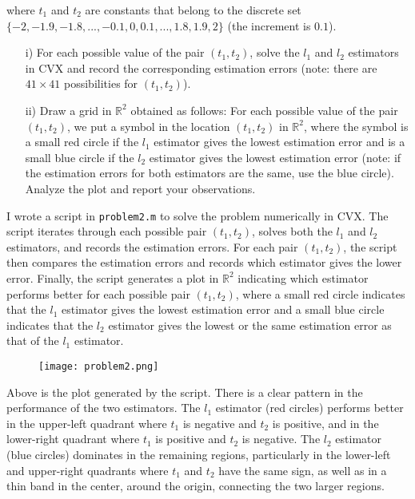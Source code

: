 \begin{homeworkProblem}
    where $t_1$ and $t_2$ are constants that belong to the discrete set 
    $\{-2, -1.9, -1.8, ..., -0.1, 0, 0.1, ..., 1.8, 1.9, 2\}$ (the increment 
    is $0.1$).
    
    \begin{itemize}
        \item [i)] For each possible value of the pair $(t_1, t_2)$, solve the 
            $l_1$ and $l_2$ estimators in CVX and record the corresponding 
            estimation errors (note: there are $41 \times 41$ possibilities 
            for $(t_1, t_2)$). 
        \item [ii)] Draw a grid in $\mathbb R^2$ obtained as follows: For each 
            possible value of the pair $(t_1, t_2)$, we put a symbol in the 
            location $(t_1, t_2)$ in $\mathbb R^2$, where the symbol is a small 
            red circle if the $l_1$ estimator gives the lowest estimation error 
            and is a small blue circle if the $l_2$ estimator gives the lowest 
            estimation error (note: if the estimation errors for both 
            estimators are the same, use the blue circle). Analyze the plot 
            and report your observations. 
    \end{itemize}

    \begin{solution}
        
        I wrote a script in \texttt{problem2.m} to solve the problem
        numerically in CVX. The script iterates through each possible pair
        $(t_1, t_2)$, solves both the $l_1$ and $l_2$ estimators, and
        records the estimation errors. For each pair $(t_1, t_2)$, the 
        script then compares the estimation errors and records which estimator 
        gives the lower error. Finally, the script generates a plot in 
        $\mathbb{R}^2$ indicating which estimator performs better for each 
        possible pair $(t_1, t_2)$, where a small red circle indicates that 
        the $l_1$ estimator gives the lowest estimation error and a small blue 
        circle indicates that the $l_2$ estimator gives the lowest or the same 
        estimation error as that of the $l_1$ estimator.

        \begin{figure}[h!]
            \centering
            \texttt{[image: problem2.png]}
        \end{figure}

        \pagebreak

        Above is the plot generated by the script. There is a clear pattern 
        in the performance of the two estimators. The $l_1$ estimator (red 
        circles) performs better in the upper-left quadrant where $t_1$ is
        negative and $t_2$ is positive, and in the lower-right quadrant where 
        $t_1$ is positive and $t_2$ is negative. The $l_2$ estimator 
        (blue circles) dominates in the remaining regions, particularly in 
        the lower-left and upper-right quadrants where $t_1$ and $t_2$ have 
        the same sign, as well as in a thin band in the center, around the
        origin, connecting the two larger regions.
        

\end{solution}
\end{homeworkProblem}
